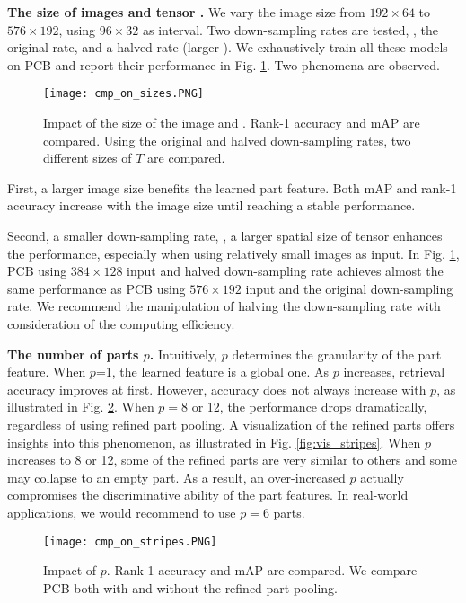 \documentclass[10pt,twocolumn,letterpaper]{article}
\begin{document}
\textbf{The size of images and tensor .} We vary the image size from $192 \times 64$ to $576 \times 192$, using $96 \times 32$ as interval. Two down-sampling rates are tested, \ie, the original rate, and a halved rate (larger ).   
We exhaustively train all these models on PCB and report their performance in Fig. \ref{fig:cmp_sizes}. Two phenomena are observed.

\begin{figure}[t]
\begin{center}
\texttt{[image: cmp\_on\_sizes.PNG]}
\end{center}

   \caption{Impact of the size of the image and . Rank-1 accuracy and mAP are compared. Using the original and halved down-sampling rates, two different sizes of \bm${T}$ are compared.} 
\label{fig:cmp_sizes}
\end{figure}


First, a larger image size benefits the learned part feature. Both mAP and rank-1 accuracy increase with the image size until reaching a stable performance.

Second, a smaller down-sampling rate, \ie, a larger spatial size of tensor  enhances the performance, especially when using relatively small images as input. In Fig. \ref{fig:cmp_sizes},  PCB  using $384 \times 128$ input and halved down-sampling rate achieves almost the same performance as PCB using $576 \times 192$ input and the original down-sampling rate. We recommend the manipulation of halving the down-sampling rate with consideration of the computing efficiency. 


\textbf{The number of parts $p$.} Intuitively, $p$ determines the granularity of the part feature. When $p$=1, the learned feature is a global one. As $p$ increases, retrieval accuracy improves at first. However, accuracy does not always increase with $p$, as illustrated in Fig. \ref{fig:stripes}. When $p = 8$ or 12, the performance drops dramatically, regardless of using refined part pooling. A visualization of the refined parts offers insights into this phenomenon, as illustrated in Fig. \ref{fig:vis_stripes}. When $p$ increases to 8 or 12, some of the refined parts are very similar to others and some may collapse to an empty part. As a result, an over-increased $p$ actually compromises the discriminative ability of the part features. In real-world applications, we would recommend to use $p=6$ parts.
\begin{figure}[t]
\setlength{\belowcaptionskip}{-0.4cm}
\begin{center}
\texttt{[image: cmp\_on\_stripes.PNG]}
\end{center}
   \caption{Impact of $p$. Rank-1 accuracy and mAP are compared. We compare PCB both with and without  the refined part pooling.}
\label{fig:stripes}
\end{figure}
\end{document}
